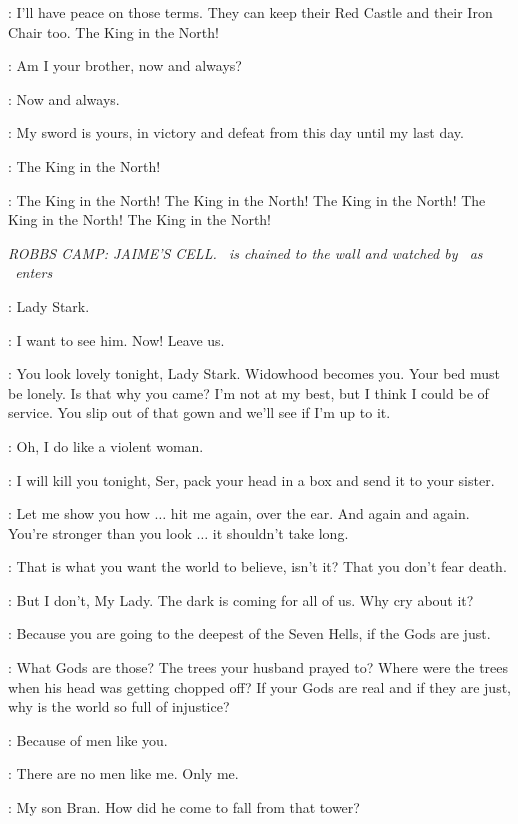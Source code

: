 \BRACKEN: I'll have peace on those terms. They can keep their Red Castle and their Iron Chair too. The King in the North! 

\THEON: Am I your brother, now and always? 

\ROBB: Now and always. 

\THEON: My sword is yours, in victory and defeat from this day until my last day. 

\UMBER: The King in the North! 

\CROWD: The King in the North! The King in the North! The King in the North! The King in the North! The King in the North! 


\scene

\textit{ROBBS CAMP: JAIME'S CELL.  \JAIME ~is chained to the wall and watched by \GUARD ~as \CATELYN ~enters} 

\GUARD: Lady Stark. 

\CATELYN: I want to see him. Now! Leave us. 

\JAIME: You look lovely tonight, Lady Stark. Widowhood becomes you. Your bed must be lonely. Is that why you came? I'm not at my best, but I think I could be of service. You slip out of that gown and we'll see if I'm up to it. 


\JAIME: Oh, I do like a violent woman. 

\CATELYN: I will kill you tonight, Ser, pack your head in a box and send it to your sister. 

\JAIME: Let me show you how $\ldots$  hit me again, over the ear. And again and again. You're stronger than you look $\ldots$ it shouldn't take long. 

\CATELYN: That is what you want the world to believe, isn't it? That you don't fear death. 

\JAIME: But I don't, My Lady. The dark is coming for all of us. Why cry about it? 

\CATELYN: Because you are going to the deepest of the Seven Hells, if the Gods are just. 

\JAIME: What Gods are those? The trees your husband prayed to? Where were the trees when his head was getting chopped off? If your Gods are real and if they are just, why is the world so full of injustice? 

\CATELYN: Because of men like you. 

\JAIME: There are no men like me. Only me. 

\CATELYN: My son Bran. How did he come to fall from that tower? 

